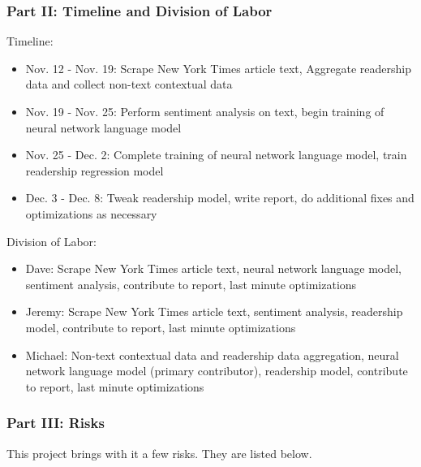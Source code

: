 \documentclass[10pt]{article}
\begin{document}
\subsubsection*{Part II: Timeline and Division of Labor}

Timeline:
\begin{itemize}
\item Nov. 12 - Nov. 19: Scrape New York Times article text, Aggregate readership data and collect non-text contextual data
\item Nov. 19 - Nov. 25: Perform sentiment analysis on text, begin training of neural network language model
\item Nov. 25 - Dec. 2: Complete training of neural network language model, train readership regression model
\item Dec. 3 - Dec. 8: Tweak readership model, write report, do additional fixes and optimizations as necessary
\end{itemize}

Division of Labor:
\begin{itemize}
\item Dave: Scrape New York Times article text, neural network language model, sentiment analysis, contribute to report, last minute optimizations
\item Jeremy: Scrape New York Times article text, sentiment analysis, readership model, contribute to report, last minute optimizations
\item Michael: Non-text contextual data and readership data aggregation, neural network language model (primary contributor), readership model, contribute to report, last minute optimizations
\end{itemize}

\subsubsection*{Part III: Risks}

This project brings with it a few risks. They are listed below.
\end{document}
